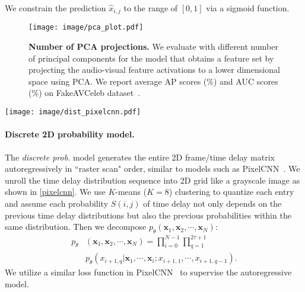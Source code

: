 \documentclass[10pt,twocolumn,letterpaper]{article}
\newcommand{\mypar}[1]{\vspace{-3mm}\paragraph{#1}}
\def\upvspacefig{\vspace{-0.0mm}}
\begin{document}
We constrain the prediction $\hat{x}_{i,j}$ to the range of $[0, 1]$ via a sigmoid function.
\begin{figure}[t]
    \centering
    \upvspacefig
    \texttt{[image: image/pca\_plot.pdf]}
    \caption{\textbf{Number of PCA projections.} We evaluate with different number of principal components for the model that obtains a feature set by projecting the audio-visual feature activations to a lower dimensional space using PCA. We report average AP scores ($\%$) and AUC scores ($\%$) on FakeAVCeleb dataset~\cite{NEURIPS_DATASETS_AND_BENCHMARKS2021_d9d4f495}.} 
    \label{number_pca}
\end{figure} \begin{figure*}[t!]
    \centering
    \upvspacefig
 \texttt{[image: image/dist\_pixelcnn.pdf]}
    \caption{\textbf{Visualization of discrete probability grid.} We use K-means clustering to quantize the probability space to convert continuous synchronization probability $S(i,j)$ to discrete probability bin $\hat{S}(i,j)$. Then we build a autoregressive Transformer~\cite{vaswani2017attention} model on the probability grid. }
    \label{pixelcnn}
\end{figure*}
 \mypar{Discrete 2D probability model.} 
The {\em discrete prob.} model generates the entire 2D frame/time delay matrix autoregressively in ``raster scan" order, similar to models such as PixelCNN~\cite{van2016pixel,salimans2017pixelcnn++}. We unroll the time delay distribution sequence into 2D grid like a grayscale image as shown in \cref{pixelcnn}. We use $K$-means ($K=8$) clustering to quantize each entry and assume each probability $\hat{S}(i,j)$ of time delay not only depends on the previous time delay distributions but also the previous probabilities within the same distribution. Then we decompose $ p_{\theta}(\mathbf{x}_{1}, \mathbf{x}_{2}, \cdots , \mathbf{x}_{N})$:
\begin{equation}\label{eq_pixelcnn}
\begin{split}
    p_{\theta}&(\mathbf{x}_{1}, \mathbf{x}_{2}, \cdots , \mathbf{x}_{N}) = 
    \prod_{i=0}^{N-1}\prod_{q=1}^{2\tau + 1}\\
    &p_{\theta}(x_{i+1, q}|\mathbf{x}_{1},
    \cdots,\mathbf{x}_{i};x_{i+1, 1},\cdots,x_{i+1,q-1}).
\end{split}
\end{equation}
We utilize a similar loss function in PixelCNN~\cite{salimans2017pixelcnn++,van2016pixel} to supervise the autoregressive model.
\end{document}
